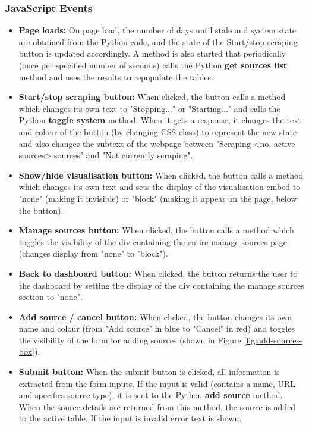 \documentclass{l4proj}
\begin{document}
\subsubsection{JavaScript Events}
\begin{itemize}
    \item \textbf{Page loads: } On page load, the number of days until stale and system state are obtained from the Python code, and the state of the Start/stop scraping button is updated accordingly. A method is also started that periodically (once per specified number of seconds) calls the Python \textbf{get sources list} method and uses the results to repopulate the tables.
    \item \textbf{Start/stop scraping button:} When clicked, the button calls a method which changes its own text to "Stopping..." or "Starting..." and calls the Python \textbf{toggle system} method. When it gets a response, it changes the text and colour of the button (by changing CSS class) to represent the new state and also changes the subtext of the webpage between "Scraping <no. active sources> sources" and "Not currently scraping".
    \item \textbf{Show/hide visualisation button: } When clicked, the button calls a method which changes its own text and sets the display of the visualisation embed to "none" (making it invisible) or "block" (making it appear on the page, below the button).
    \item \textbf{Manage sources button: } When clicked, the button calls a method which toggles the visibility of the div containing the entire manage sources page (changes display from "none" to "block").
    \item \textbf{Back to dashboard button: } When clicked, the button returns the user to the dashboard by setting the display of the div containing the manage sources section to "none".
    \item \textbf{Add source / cancel button: } When clicked, the button changes its own name and colour (from "Add source" in blue to "Cancel" in red) and toggles the visibility of the form for adding sources (shown in Figure \ref{fig:add-sources-box}).
    \item \textbf{Submit button: } When the submit button is clicked, all information is extracted from the form inputs. If the input is valid (contains a name, URL and specifies source type), it is sent to the Python \textbf{add source} method. When the source details are returned from this method, the source is added to the active table. If the input is invalid error text is shown.

\end{itemize}
\end{document}
